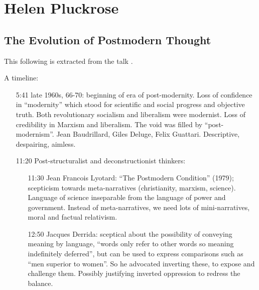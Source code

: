 \documentclass[10pt,titlepage]{book}
\begin{document}
\cite{pinker-tbs,pinker-angels,pinker-en}

\section{Helen Pluckrose}

\subsection{The Evolution of Postmodern Thought}\label{EPT}

This following is extracted from the talk \cite{pluckrose-evolution}.

A timeline:
\begin{itemize}
\item[5:41] late 1960s, 66-70: beginning of era of post-modernity.
  Loss of confidence in ``modernity'' which stood for scientific and social progress and objective truth.
  Both revolutionary socialism and liberalism were modernist.
  Loss of credibility in Marxism and liberalism.
  The void was filled by ``post-modernism''.
   Jean Baudrillard, Giles Deluge, Felix Guattari.
   Descriptive, despairing, aimless.
 \item[11:20]Post-structuralist and deconstructionist thinkers:

   \begin{itemize}

   \item[11:30] Jean Francois Lyotard: ``The Postmodern Condition'' (1979); scepticism towards meta-narratives (christianity, marxism, science).
     Language of science inseparable from the language of power and government.
     Instead of meta-narratives, we need lots of mini-narratives, moral and factual relativism.

   \item[12:50] Jacques Derrida: sceptical about the possibility of conveying meaning by language, ``words only refer to other words so meaning indefinitely deferred'', but can be used to express comparisons such as ``men superior to women''.  So he advocated inverting these, to expose and challenge them.  Possibly justifying inverted oppression to redress the balance.


\end{itemize}
\end{itemize}
\end{document}
